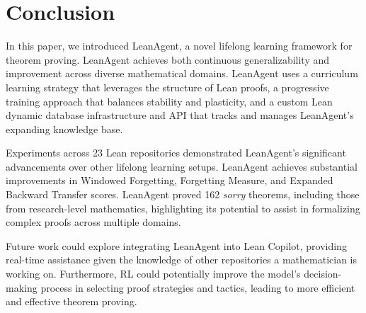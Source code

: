 \documentclass{article} %
\begin{document}

\section{Conclusion}

In this paper, we introduced LeanAgent, a novel lifelong learning framework for theorem proving. LeanAgent achieves both continuous generalizability and improvement across diverse mathematical domains. LeanAgent uses a curriculum learning strategy that leverages the structure of Lean proofs, a progressive training approach that balances stability and plasticity, and a custom Lean dynamic database infrastructure and API that tracks and manages LeanAgent's expanding knowledge base.

Experiments across 23 Lean repositories demonstrated LeanAgent's significant advancements over other lifelong learning setups. LeanAgent achieves substantial improvements in Windowed Forgetting, Forgetting Measure, and Expanded Backward Transfer scores. LeanAgent proved 162 \textit{sorry} theorems, including those from research-level mathematics, highlighting its potential to assist in formalizing complex proofs across multiple domains.

Future work could explore integrating LeanAgent into Lean Copilot, providing real-time assistance given the knowledge of other repositories a mathematician is working on. Furthermore, RL could potentially improve the model's decision-making process in selecting proof strategies and tactics, leading to more efficient and effective theorem proving.
\end{document}
